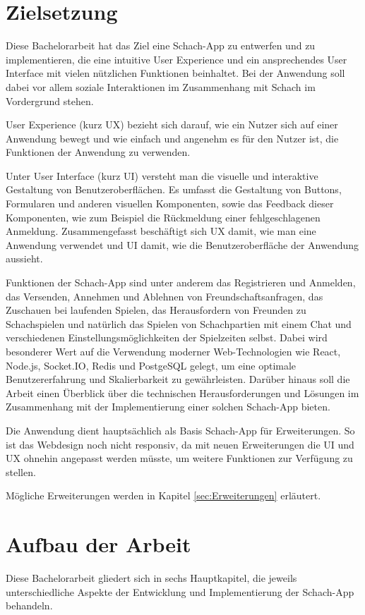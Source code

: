    \section{Zielsetzung}
    \label{sec:Zielsetzung}
    Diese Bachelorarbeit hat das Ziel eine Schach-App zu entwerfen und zu implementieren, die eine intuitive User Experience und ein ansprechendes User Interface mit vielen nützlichen Funktionen beinhaltet. Bei der Anwendung soll dabei vor allem soziale Interaktionen im Zusammenhang mit Schach im Vordergrund stehen.
    
User Experience (kurz UX) bezieht sich darauf, wie ein Nutzer sich auf einer Anwendung bewegt und wie einfach und angenehm es für den Nutzer ist, die Funktionen der Anwendung zu verwenden.
    
    Unter User Interface (kurz UI) versteht man die visuelle und interaktive Gestaltung von Benutzeroberflächen. Es umfasst die Gestaltung von Buttons, Formularen und anderen visuellen Komponenten, sowie das Feedback dieser Komponenten, wie zum Beispiel die Rückmeldung einer fehlgeschlagenen Anmeldung.
    Zusammengefasst beschäftigt sich UX damit, wie man eine Anwendung verwendet und UI damit, wie die Benutzeroberfläche der Anwendung aussieht.\cite{webdesign}
        
        Funktionen der Schach-App sind unter anderem das Registrieren und Anmelden, das Versenden, Annehmen und Ablehnen von Freundschaftsanfragen, das Zuschauen bei laufenden Spielen, das Herausfordern von Freunden zu Schachspielen und natürlich das Spielen von Schachpartien mit einem Chat und verschiedenen Einstellungsmöglichkeiten der Spielzeiten selbst.
    Dabei wird besonderer Wert auf die Verwendung moderner Web-Technologien wie React, Node.js, Socket.IO, Redis und PostgeSQL gelegt, um eine optimale Benutzererfahrung und Skalierbarkeit zu gewährleisten. Darüber hinaus soll die Arbeit einen Überblick über die technischen Herausforderungen und Lösungen im Zusammenhang mit der Implementierung einer solchen Schach-App bieten.
    
Die Anwendung dient hauptsächlich als Basis Schach-App für Erweiterungen. So ist das Webdesign noch nicht responsiv, da mit neuen Erweiterungen die UI und UX ohnehin angepasst werden müsste, um weitere Funktionen zur Verfügung zu stellen.

Mögliche Erweiterungen werden in Kapitel \ref{sec:Erweiterungen} erläutert.
    
    \section{Aufbau der Arbeit}
Diese Bachelorarbeit gliedert sich in sechs Hauptkapitel, die jeweils unterschiedliche Aspekte der Entwicklung und Implementierung der Schach-App behandeln.

